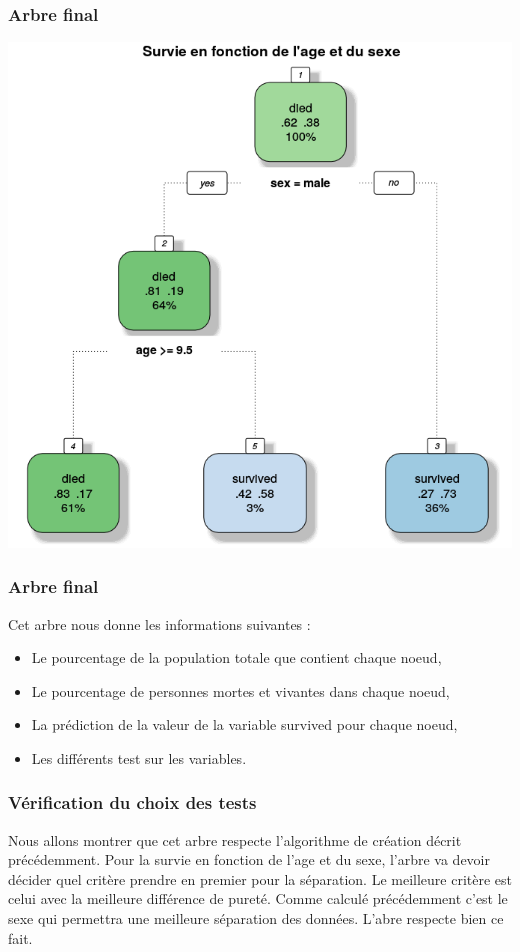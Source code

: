 \documentclass[compress]{beamer}
\begin{document}
\begin{frame}
\frametitle{Arbre final}

      \begin{center}
           \includegraphics[width=\textwidth,height=0.8\textheight,keepaspectratio]{img/fancy.png}
        \end{center}
\end{frame}

\begin{frame}
\frametitle{Arbre final}
Cet arbre nous donne les informations suivantes : \newline
\begin{itemize}
 \item Le pourcentage de la population totale que contient chaque noeud,
 \item Le pourcentage de personnes mortes et vivantes dans chaque noeud,
 \item La prédiction de la valeur de la variable \textrm{survived} pour chaque noeud,
 \item Les différents test sur les variables.
\end{itemize}

\end{frame}
\begin{frame}
 \frametitle{Vérification du choix des tests}
Nous allons montrer que cet arbre respecte l'algorithme de création décrit précédemment. Pour la survie en fonction de l'age et du sexe, l'arbre va devoir décider quel
critère prendre en premier pour la séparation. Le meilleure critère est celui avec la meilleure différence de pureté. Comme calculé précédemment c'est
le sexe qui permettra une meilleure séparation des données. L'abre respecte bien ce fait. 
\end{frame}
\end{document}
